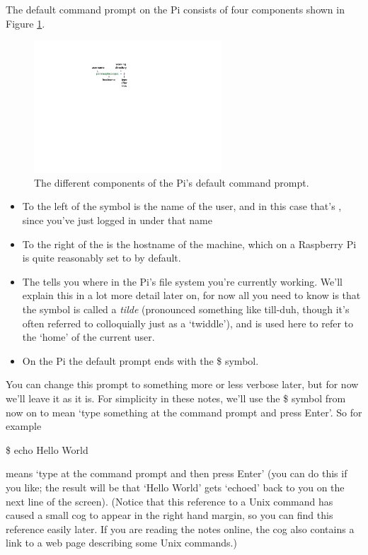 The default command prompt on the Pi consists of four components shown in Figure \ref{figure:prompt}.

\begin{figure}
\centerline{\includegraphics[width=7cm]{images/default-prompt}}
\caption{The different components of the Pi's default command prompt.}\label{figure:prompt}
\end{figure}


\begin{itemize}
\item To the left of the  symbol is the name of the user, and in this case that's , since you've just logged in under that name
\item To the right of the  is the hostname of the machine, which on a Raspberry Pi is quite reasonably set to  by default.
\item The \texttildelow{} tells you where in the Pi's file system you're currently working. We'll explain this in a lot more detail later on, for now all you need to know is that the \texttildelow{} symbol is called a \textit{tilde} (pronounced something like till-duh, though it's often referred to colloquially just as a `twiddle'), and is used here to refer to the `home' of the current user.
\item On the Pi the default prompt ends with the \$ symbol.
\end{itemize}

You can change this prompt to something more or less verbose later, but for now we'll leave it as it is. For simplicity in these notes, we'll use the \$ symbol from now on to mean `type something at the command prompt and press Enter'. So for example

\begin{ttoutenv}
\$ echo Hello World
\end{ttoutenv}

\noindent means `type  at the command prompt and then press Enter' (you can do this if you like; the result will be that `Hello World' gets `echoed'  back to you on the next line of the screen). (Notice that this reference to a Unix command has caused a small cog to appear in the right hand margin, so you can find this reference easily later. If you are reading the notes online, the cog also contains a link to a web page describing some Unix commands.)

